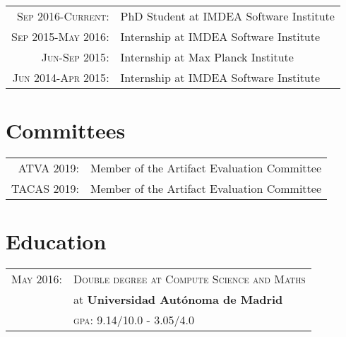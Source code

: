 \documentclass[a4paper,10pt]{article} %
\begin{document}
\begin{tabular}{rp{11cm}}
\textsc{Sep 2016-Current}: & PhD Student at IMDEA Software Institute\\

\textsc{Sep 2015-May 2016}: & Internship at IMDEA Software Institute\\

\textsc{Jun-Sep 2015}: & Internship at Max Planck Institute\\

\textsc{Jun 2014-Apr 2015}: & Internship at IMDEA Software Institute\\
\end{tabular}


\section{Committees}
\begin{tabular}{rl}
\textsc{ATVA} 2019: & Member of the Artifact Evaluation Committee \\
\textsc{TACAS} 2019: & Member of the Artifact Evaluation Committee
\end{tabular}


\section{Education}
\begin{tabular}{rl}

\textsc{May} 2016: & \textsc{Double degree at Compute Science and Maths}\\
& at \textbf{Universidad Autónoma de Madrid} \\
& \normalsize \textsc{gpa}: 9.14/10.0 - 3.05/4.0\\
\end{tabular}
\end{document}
